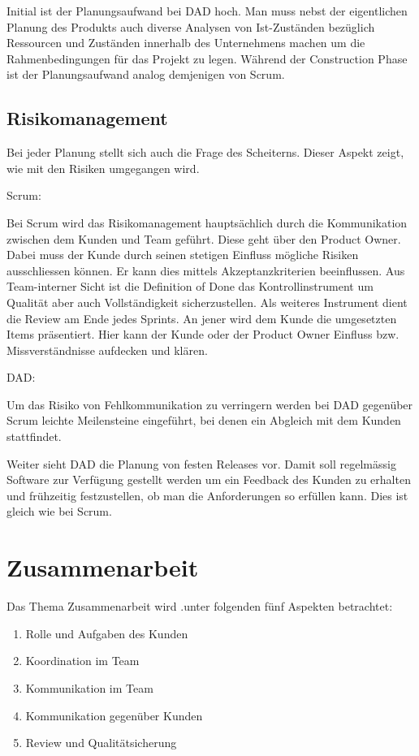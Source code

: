 Initial ist der Planungsaufwand bei DAD hoch. Man muss nebst der eigentlichen Planung des Produkts auch diverse Analysen von Ist-Zuständen bezüglich Ressourcen und Zuständen innerhalb des Unternehmens machen um die Rahmenbedingungen für das Projekt zu legen. Während der Construction Phase ist der Planungsaufwand analog demjenigen von Scrum.


\subsection{Risikomanagement}

Bei jeder Planung stellt sich auch die Frage des Scheiterns. Dieser Aspekt zeigt, wie mit den Risiken umgegangen wird.

{\Large Scrum:} \medskip

Bei Scrum wird das Risikomanagement hauptsächlich durch die Kommunikation zwischen dem Kunden und Team geführt. Diese geht über den Product Owner. Dabei muss der Kunde durch seinen stetigen Einfluss mögliche Risiken ausschliessen können. Er kann dies mittels Akzeptanzkriterien beeinflussen.\newline
Aus Team-interner Sicht ist die Definition of Done das Kontrollinstrument um Qualität aber auch Vollständigkeit sicherzustellen.
Als weiteres Instrument dient die Review am Ende jedes Sprints. An jener wird dem Kunde die umgesetzten Items präsentiert. Hier kann der Kunde oder der Product Owner Einfluss bzw. Missverständnisse aufdecken und klären.

\bigskip 

{\Large DAD:} \medskip

Um das Risiko von Fehlkommunikation zu verringern werden bei DAD gegenüber Scrum leichte Meilensteine eingeführt, bei denen ein Abgleich mit dem Kunden stattfindet. \medskip

Weiter sieht DAD die Planung von festen Releases vor. Damit soll regelmässig Software zur Verfügung gestellt werden um ein Feedback des Kunden zu erhalten und frühzeitig festzustellen, ob man die Anforderungen so erfüllen kann. Dies ist gleich wie bei Scrum.

\section{Zusammenarbeit}

Das Thema Zusammenarbeit wird .unter folgenden fünf Aspekten betrachtet:
\begin{enumerate}
\item Rolle und Aufgaben des Kunden
\item Koordination im Team
\item Kommunikation im Team
\item Kommunikation gegenüber Kunden
\item Review und Qualitätsicherung
\end{enumerate}

